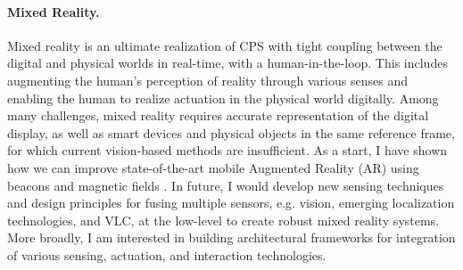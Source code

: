 \documentclass[10pt]{article}
\begin{document}

\paragraph{Mixed Reality. }
Mixed reality is an ultimate realization of CPS with tight coupling between the digital and physical worlds in real-time, with a human-in-the-loop. %
This includes augmenting the human's perception of reality through various senses and enabling the human to realize actuation in the physical world digitally. Among many challenges, 
mixed reality requires accurate representation of the digital display, as well as smart devices and physical objects in the same reference frame, for which current vision-based methods are insufficient.  As a start, I have shown how we can improve state-of-the-art mobile Augmented Reality (AR) using beacons and magnetic fields \cite{mobileAR}. In future, I would develop new sensing techniques and design principles for fusing multiple sensors, e.g. vision, emerging localization technologies, and VLC, at the low-level to create robust mixed reality systems. More broadly, I am interested in building architectural frameworks for integration of various sensing, actuation, and interaction technologies. 
\end{document}
